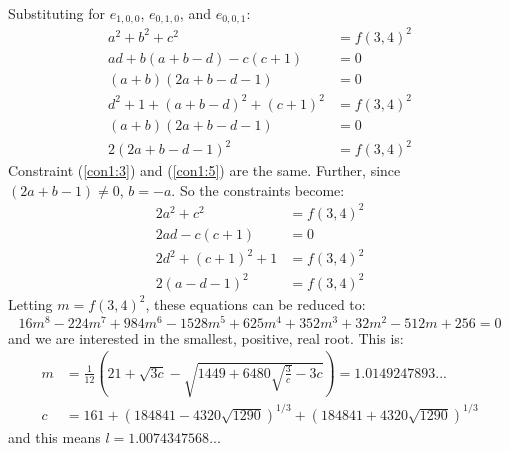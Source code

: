 \documentclass[12pt,titlepage]{article}
\begin{document}
Substituting for $e_{1,0,0}$, $e_{0,1,0}$, and $e_{0,0,1}$:
\begin{align}
a^2 + b^2 + c^2               &= f(3,4)^2 \label{con1:1} \\
ad + b(a+b-d) - c(c+1)        &= 0        \label{con1:2} \\
(a+b)(2a+b-d-1)               &= 0        \label{con1:3} \\
d^2 + 1 + (a+b-d)^2 + (c+1)^2 &= f(3,4)^2 \label{con1:4} \\
(a+b)(2a+b-d-1)               &= 0        \label{con1:5} \\
2(2a+b-d-1)^2                 &= f(3,4)^2 \label{con1:6}
\end{align}
Constraint (\ref{con1:3}) and (\ref{con1:5}) are the same.  Further, since
$(2a+b-1) \ne 0$, $b = -a$.  So the constraints become:
\begin{align*}
2a^2 + c^2         &= f(3,4)^2  \\
2ad - c(c+1)       &= 0         \\
2d^2 + (c+1)^2 + 1 &= f(3,4)^2  \\
2(a-d-1)^2         &= f(3,4)^2 
\end{align*}
Letting $m = f(3,4)^2$, these equations can be reduced to:
\begin{equation*}
16 m^8 - 224 m^7 + 984 m^6 - 1528 m^5 +625 m^4 + 352 m^3 + 32 m^2 - 512 m +
256 = 0
\end{equation*}
and we are interested in the smallest, positive, real root.  This is:
\begin{align*}
m &= \frac{1}{12}\left
     (21 + \sqrt{3c} - \sqrt{1449 + 6480\sqrt{\frac{3}{c}} - 3c}\right)
   = 1.0149247893...
\\
c &= 161 + (184841 - 4320\sqrt{1290})^{1/3}
         + (184841 + 4320\sqrt{1290})^{1/3}
\end{align*}
and this means $l = 1.0074347568...$
\end{document}
